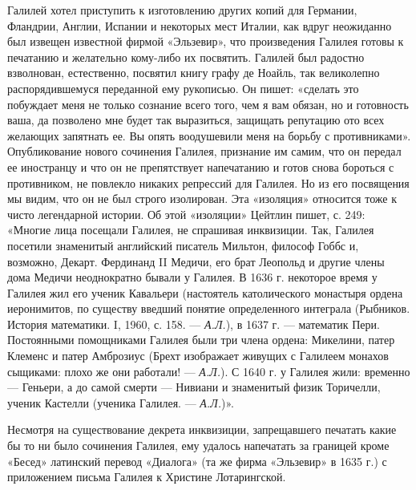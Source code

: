 Галилей хотел приступить к изготовлению других копий для Германии, Фландрии,
Англии, Испании и некоторых мест Италии, как вдруг неожиданно был извещен
известной фирмой «Эльзевир», что произведения Галилея готовы к печатанию и
желательно кому-либо их посвятить. Галилей был радостно взволнован,
естественно, посвятил книгу графу де Ноайль, так великолепно распорядившемуся
переданной ему рукописью. Он пишет: «сделать это побуждает меня не только
сознание всего того, чем я вам обязан, но и готовность ваша, да позволено мне
будет так выразиться, защищать репутацию ото всех желающих запятнать ее. Вы
опять воодушевили меня на борьбу с противниками». Опубликование нового
сочинения Галилея, признание им самим, что он передал ее иностранцу и что он не
препятствует напечатанию и готов снова бороться с противником, не повлекло
никаких репрессий для Галилея. Но из его посвящения мы видим, что он не был
строго изолирован. Эта «изоляция» относится тоже к чисто легендарной истории.
Об этой «изоляции» Цейтлин пишет, с. 249: «Многие лица посещали Галилея, не
спрашивая инквизиции. Так, Галилея посетили знаменитый английский писатель
Мильтон, философ Гоббс и, возможно, Декарт. Фердинанд II Медичи, его брат
Леопольд и другие члены дома Медичи неоднократно бывали у Галилея. В 1636 г.
некоторое время у Галилея жил его ученик Кавальери (настоятель католического
монастыря ордена иеронимитов, по существу введший понятие определенного
интеграла (Рыбников. История математики. I, 1960, с. 158. --- \emph{А.Л.}), в 1637 г. ---
математик Пери. Постоянными помощниками Галилея были три члена ордена:
Микелини, патер Клеменс и патер Амброзиус (Брехт изображает живущих с Галилеем
монахов сыщиками: плохо же они работали! --- \emph{А.Л.}). С 1640 г. у Галилея жили:
временно --- Геньери, а до самой смерти --- Нивиани и знаменитый физик Торичелли,
ученик Кастелли (ученика Галилея. --- \emph{А.Л.})».

Несмотря на существование декрета инквизиции, запрещавшего печатать какие бы то
ни было сочинения Галилея, ему удалось напечатать за границей кроме «Бесед»
латинский перевод «Диалога» (та же фирма «Эльзевир» в 1635 г.) с приложением
письма Галилея к Христине Лотарингской.

